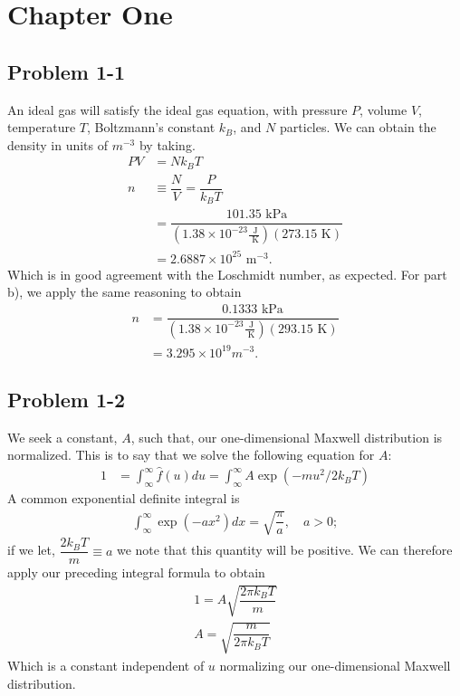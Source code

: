 \chapter*{Chapter One}
\label{ch:One}

\section*{Problem 1-1}
\label{sec:1-1}
An ideal gas will satisfy the ideal gas equation, with pressure \(P\), volume \(V\), temperature \(T\), Boltzmann's constant \(k_B\), and \(N\) particles. We can obtain the density in units of \(m^{-3}\) by taking.
\begin{align}
	PV &= Nk_BT \\
	n &\equiv \dfrac{N}{V} = \dfrac{P}{k_BT} \\
	  &= \dfrac{101.35\text{ kPa}}{(1.38\times10^{-23}\frac{\text{ J}}{\text{ K}})(273.15\text{ K})}\\
	  &= 2.6887\times10^{25}\text{ m}^{-3}.
\end{align}
Which is in good agreement with the Loschmidt number, as expected. 
For part b), we apply the same reasoning to obtain
\begin{align}
	n &= \dfrac{0.1333\text{ kPa}}{(1.38\times10^{-23}\frac{\text{ J}}{\text{ K}})(293.15\text{ K})}\\
	&= 3.295\times10^{19}m^{-3}.
\end{align}

\section*{Problem 1-2}
\label{sec:1-2}
We seek a constant, \(A\), such that, our one-dimensional Maxwell distribution is normalized. This is to say that we solve the following equation for \(A\):
\begin{align}
	1 &= \int_\infty^\infty \hat{f}(u)du = \int_\infty^\infty A \exp{(-mu^2/2k_BT)}
\end{align}
A common exponential definite integral is
\begin{align}
	\int_\infty^\infty \exp(-ax^2)dx = \sqrt{{\dfrac{\pi}{a}}}, \quad a > 0;
\end{align}
if we let, \(\dfrac{2k_BT}{m} \equiv a \) we note that this quantity will be positive. We can therefore apply our preceding integral formula to obtain
\begin{align}
	1 = A\sqrt{\dfrac{2\pi k_BT}{m}} \\
	A = \sqrt{\dfrac{m}{2\pi k_BT}}
\end{align}
Which is a constant independent of \(u\) normalizing our one-dimensional Maxwell distribution. 

